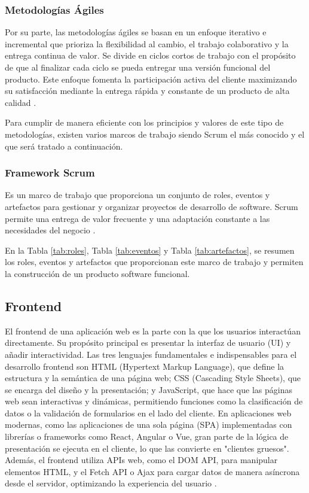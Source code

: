 \subsubsection{Metodologías Ágiles}
Por su parte, las metodologías ágiles se basan en un enfoque iterativo e incremental que prioriza la flexibilidad al cambio, el trabajo colaborativo y la entrega continua de valor. Se divide en ciclos cortos de trabajo con el propósito de que al finalizar cada ciclo se pueda entregar una versión funcional del producto. Este enfoque fomenta la participación activa del cliente maximizando su satisfacción mediante la entrega rápida y constante de un producto de alta calidad \cite{stellman2014learning}.

Para cumplir de manera eficiente con los principios y valores de este tipo de metodologías, existen varios marcos de trabajo siendo Scrum el más conocido y el que será tratado a continuación.

\subsubsection{Framework Scrum}
Es un marco de trabajo que proporciona un conjunto de roles, eventos y artefactos para gestionar y organizar proyectos de desarrollo de software. Scrum permite una entrega de valor frecuente y una adaptación constante a las necesidades del negocio \cite{schwaber2011scrum}. 

En la Tabla \ref{tab:roles}, Tabla \ref{tab:eventos} y Tabla \ref{tab:artefactos}, se resumen los roles, eventos y artefactos que proporcionan este marco de trabajo y permiten la construcción de un producto software funcional.







\subsection{Frontend}
El frontend de una aplicación web es la parte con la que los usuarios interactúan directamente. Su propósito principal es presentar la interfaz de usuario (UI) y añadir interactividad. Las tres lenguajes fundamentales e indispensables para el desarrollo frontend son HTML (Hypertext Markup Language), que define la estructura y la semántica de una página web; CSS (Cascading Style Sheets), que se encarga del diseño y la presentación; y JavaScript, que hace que las páginas web sean interactivas y dinámicas, permitiendo funciones como la clasificación de datos o la validación de formularios en el lado del cliente. En aplicaciones web modernas, como las aplicaciones de una sola página (SPA) implementadas con librerías o frameworks como React, Angular o Vue, gran parte de la lógica de presentación se ejecuta en el cliente, lo que las convierte en "clientes gruesos". Además, el frontend utiliza APIs web, como el DOM API, para manipular elementos HTML, y el Fetch API o Ajax para cargar datos de manera asíncrona desde el servidor, optimizando la experiencia del usuario \cite{ackermann2023full}.


